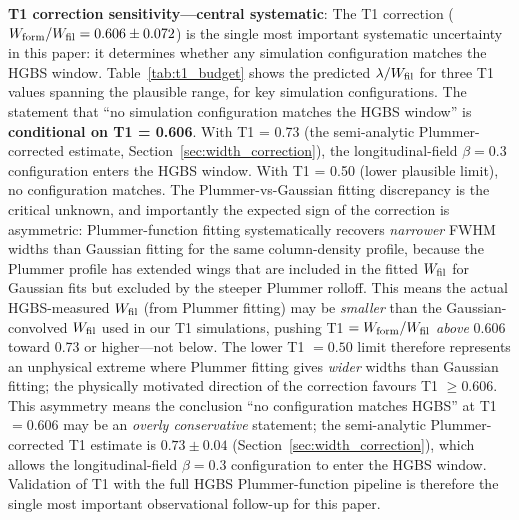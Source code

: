 \documentclass[twoside,twocolumn]{mnras}
\begin{document}
\textbf{T1 correction sensitivity---central systematic}: The T1 correction
($W_{\rm form}/W_{\rm fil} = 0.606 \pm 0.072$) is the single most important systematic
uncertainty in this paper: it determines whether any simulation configuration matches
the HGBS window. Table~\ref{tab:t1_budget} shows the predicted $\lambda/W_{\rm fil}$
for three T1 values spanning the plausible range, for key simulation configurations.
The statement that ``no simulation configuration matches the HGBS window'' is
\textbf{conditional on T1 = 0.606}. With T1 = 0.73 (the semi-analytic Plummer-corrected estimate, Section~\ref{sec:width_correction}), the longitudinal-field $\beta = 0.3$ configuration enters the HGBS window.
With T1 = 0.50 (lower plausible limit), no configuration matches. The Plummer-vs-Gaussian fitting discrepancy is the critical unknown, and importantly the expected sign of the correction is asymmetric: Plummer-function fitting systematically recovers \textit{narrower} FWHM widths than Gaussian fitting for the same column-density profile, because the Plummer profile has extended wings that are included in the fitted $W_{\rm fil}$ for Gaussian fits but excluded by the steeper Plummer rolloff. This means the actual HGBS-measured $W_{\rm fil}$ (from Plummer fitting) may be \textit{smaller} than the Gaussian-convolved $W_{\rm fil}$ used in our T1 simulations, pushing T1 $= W_{\rm form}/W_{\rm fil}$ \textit{above} 0.606 toward 0.73 or higher---not below. The lower T1 $= 0.50$ limit therefore represents an unphysical extreme where Plummer fitting gives \textit{wider} widths than Gaussian fitting; the physically motivated direction of the correction favours T1 $\geq 0.606$. This asymmetry means the conclusion ``no configuration matches HGBS'' at T1 $= 0.606$ may be an \textit{overly conservative} statement; the semi-analytic Plummer-corrected T1 estimate is $0.73 \pm 0.04$ (Section~\ref{sec:width_correction}), which allows the longitudinal-field $\beta = 0.3$ configuration to enter the HGBS window. Validation of T1 with the full HGBS Plummer-function pipeline is therefore the single most important observational follow-up for this paper.
\end{document}
